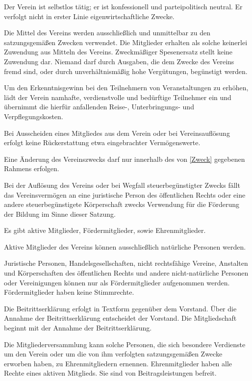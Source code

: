 \documentclass[draft]{scrartcl}
\begin{document}
\begin{contract}
Der Verein ist selbstlos tätig; er ist konfessionell und parteipolitisch
neutral. Er verfolgt nicht in erster Linie eigenwirtschaftliche Zwecke.

Die Mittel des Vereins werden ausschließlich und unmittelbar zu den
satzungsgemäßen Zwecken verwendet. Die Mitglieder erhalten als solche
keinerlei Zuwendung aus Mitteln des Vereins. Zweckmäßiger Spesenersatz stellt
keine Zuwendung dar. Niemand darf durch Ausgaben, die dem Zwecke des Vereins
fremd sind, oder durch unverhältnismäßig hohe Vergütungen, begünstigt werden.

Um den Erkenntnisgewinn bei den Teilnehmern von Veranstaltungen zu erhöhen,
lädt der Verein namhafte, verdienstvolle und bedürftige Teilnehmer ein und
übernimmt die hierfür anfallenden Reise-, Unterbringungs- und
Verpflegungskosten.

Bei Ausscheiden eines Mitgliedes aus dem Verein oder bei Vereinsauf\/lösung
erfolgt keine Rückerstattung etwa eingebrachter Vermögenswerte.

Eine Änderung des Vereinszwecks darf nur innerhalb des von \ref{Zweck}
gegebenen Rahmens erfolgen.

Bei der Auf\/lösung des Vereins oder bei Wegfall steuerbegünstigter Zwecks
fällt das Vereinsvermögen an eine juristische Person des öffentlichen Rechts
oder eine andere steuerbegünstigete Körperschaft zwecks Verwendung für die
Förderung der Bildung im Sinne dieser Satzung.


Es gibt aktive Mitglieder, Fördermitglieder, sowie Ehrenmitglieder.

Aktive Mitglieder des Vereins können ausschließlich natürliche Personen
werden.

Juristische Personen, Handelsgesellschaften, nicht rechtsfähige Vereine,
Anstalten und Kör\-pers\-chaften des öff\-ent\-lich\-en Rechts und andere
nicht-natürliche Personen oder Vereinigungen können nur als Fördermitglieder
aufgenommen werden. Fördermitglieder haben keine Stimmrechte.

Die Beitrittserklärung erfolgt in Textform gegenüber dem Vorstand. Über die
Annahme der Beitrittserklärung entscheidet der Vorstand. Die Mitgliedschaft
beginnt mit der Annahme der Beitrittserklärung.

Die Mitgliederversammlung kann solche Personen, die sich besondere Verdienste
um den Verein oder um die von ihm verfolgten satzungsgemäßen Zwecke erworben
haben, zu Ehrenmitgliedern ernennen. Ehrenmitglieder haben alle Rechte eines
aktiven Mitglieds. Sie sind von Beitragsleistungen befreit.


\end{contract}
\end{document}
